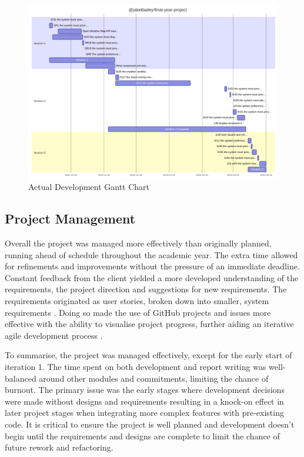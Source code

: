 \begin{landscape}
    \newpage
    \begin{figure}
        \centering
        \includegraphics[width=0.9\linewidth]{figures/dev-gantt.pdf}
        \caption{Actual Development Gantt Chart}
        \label{fig:development-gantt}
    \end{figure}
    \newpage
\end{landscape}
\subsection{Project Management}
Overall the project was managed more effectively than originally planned, running ahead of schedule throughout the academic year. The extra time allowed for refinements and improvements without the pressure of an immediate deadline. Constant feedback from the client yielded a more developed understanding of the requirements, the project direction and suggestions for new requirements. The requirements originated as user stories, broken down into smaller, system requirements . Doing so made the use of GitHub projects  and issues more effective with the ability to visualise project progress, further aiding an iterative agile development process .

To summarise, the project was managed effectively, except for the early start of iteration 1. The time spent on both development and report writing was well-balanced around other modules and commitments, limiting the chance of burnout. The primary issue was the early stages where development decisions were made without designs and requirements resulting in a knock-on effect in later project stages when integrating more complex features with pre-existing code. It is critical to ensure the project is well planned and development doesn't begin until the requirements and designs are complete to limit the chance of future rework and refactoring.

